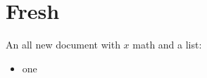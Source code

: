 \documentclass{article}
\begin{document}
\section{Fresh}
An all new document with $x$ math and a list:
\begin{itemize}
\item one
\end{itemize}
\end{document}

